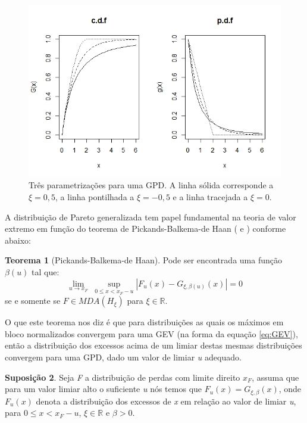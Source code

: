 \documentclass[review]{elsarticle}
\theoremstyle{definition}
\newtheorem{teor}{Teorema}%
\newtheorem{supo}[teor]{Suposição}
\begin{document}
\begin{figure}[h]
	\centering
	\includegraphics[width=0.9\linewidth]{figs/figevt1}
	\caption[Função de distribuição e densidade de probabilidades de uma GPD]{Três parametrizações para uma GPD. A linha sólida corresponde a $\xi=0,5$, a linha pontilhada a $\xi=-0,5$ e a linha tracejada a $\xi=0$.}
	\label{fig:figevt1}
\end{figure}

A distribuição de Pareto generalizada tem papel fundamental na teoria de valor extremo em função do teorema de Pickands-Balkema-de Haan (\cite{Pickands1975} e \cite{Balkema1974}) conforme abaixo:

\begin{teor}[Pickands-Balkema-de Haan]
	\label{teor:pickands}
	Pode ser encontrada uma função $\beta(u)$ tal que:
	\begin{equation*}
	\lim\limits_{u \rightarrow x_F} \; \sup\limits_{0\leq x <x_F - u} |F_u(x)-G_{\xi, \beta(u)}(x)| = 0 
	\end{equation*}
	se e somente se $F\in MDA(H_\xi)$ para $\xi \in \mathbb{R}$.
\end{teor}

O que este teorema nos diz é que para distribuições as quais os máximos em bloco normalizados convergem para uma GEV (na forma da equação \eqref{eq:GEV}), então a distribuição dos excessos acima de um limiar destas mesmas distribuições convergem para uma GPD, dado um valor de limiar \emph{u} adequado.

\begin{supo} \label{supo:excessdist}
	Seja \emph{F} a distribuição de perdas com limite direito $x_F$, assuma que para um valor limiar alto o suficiente \emph{u} nós temos que $F_u (x)=G_{\xi,\beta} (x)$, onde $F_u (x)$ denota a distribuição dos excessos de \emph{x} em relação ao valor de limiar \emph{u}, para $0 \leq x < x_F-u$, $\xi \in \mathbb{R}$ e $\beta > 0$.
\end{supo}
\end{document}
